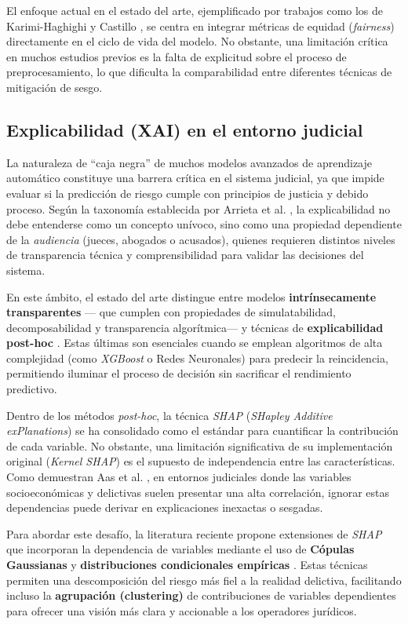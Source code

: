 \documentclass[11pt,a4paper]{article}
\begin{document}
El enfoque actual en el estado del arte, ejemplificado por trabajos como los de Karimi-Haghighi y Castillo \cite{karimi2021enhancing}, se centra en integrar métricas de equidad (\textit{fairness}) directamente en el ciclo de vida del modelo. No obstante, una limitación crítica en muchos estudios previos es la falta de explicitud sobre el proceso de preprocesamiento, lo que dificulta la comparabilidad entre diferentes técnicas de mitigación de sesgo.

\subsection{Explicabilidad (XAI) en el entorno judicial}

La naturaleza de ``caja negra'' de muchos modelos avanzados de aprendizaje automático constituye una barrera crítica en el sistema judicial, ya que impide evaluar si la predicción de riesgo cumple con principios de justicia y debido proceso. Según la taxonomía establecida por Arrieta et al. \cite{arrieta2020explainable}, la explicabilidad no debe entenderse como un concepto unívoco, sino como una propiedad dependiente de la \textit{audiencia} (jueces, abogados o acusados), quienes requieren distintos niveles de transparencia técnica y comprensibilidad para validar las decisiones del sistema.

En este ámbito, el estado del arte distingue entre modelos \textbf{intrínsecamente transparentes} --- que cumplen con propiedades de simulatabilidad, decomposabilidad y transparencia algorítmica--- y técnicas de \textbf{explicabilidad post-hoc} \cite{arrieta2020explainable}. Estas últimas son esenciales cuando se emplean algoritmos de alta complejidad (como \textit{XGBoost} o Redes Neuronales) para predecir la reincidencia, permitiendo iluminar el proceso de decisión sin sacrificar el rendimiento predictivo.

Dentro de los métodos \textit{post-hoc}, la técnica \textit{SHAP} (\textit{SHapley Additive exPlanations}) se ha consolidado como el estándar para cuantificar la contribución de cada variable. No obstante, una limitación significativa de su implementación original (\textit{Kernel SHAP}) es el supuesto de independencia entre las características. Como demuestran Aas et al. \cite{aas2021explaining}, en entornos judiciales donde las variables socioeconómicas y delictivas suelen presentar una alta correlación, ignorar estas dependencias puede derivar en explicaciones inexactas o sesgadas.

Para abordar este desafío, la literatura reciente propone extensiones de \textit{SHAP} que incorporan la dependencia de variables mediante el uso de \textbf{Cópulas Gaussianas} y \textbf{distribuciones condicionales empíricas} \cite{aas2021explaining}. Estas técnicas permiten una descomposición del riesgo más fiel a la realidad delictiva, facilitando incluso la \textbf{agrupación (clustering)} de contribuciones de variables dependientes para ofrecer una visión más clara y accionable a los operadores jurídicos.
\end{document}
